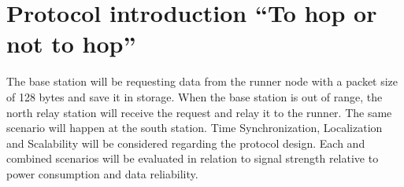 \section{Protocol introduction “To hop or not to hop”}\label{sc:protocolIntroduction}
The base station will be requesting data from the runner node with a packet size of 128 bytes and save it in storage. When the base station is out of range, the north relay station will receive the request and relay it to the runner. The same scenario will happen at the south station. Time Synchronization, Localization and Scalability will be considered regarding the protocol design. Each and combined scenarios will be evaluated in relation to signal strength relative to power consumption and data reliability. 